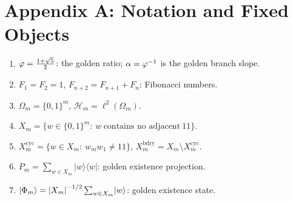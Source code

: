 \section{Appendix A: Notation and Fixed Objects}

\begin{enumerate}
  \item $\varphi=\frac{1+\sqrt5}{2}$: the golden ratio; $\alpha=\varphi^{-1}$ is the golden branch slope.
  \item $F_1=F_2=1$, $F_{n+2}=F_{n+1}+F_n$: Fibonacci numbers.
  \item $\Omega_m=\{0,1\}^m$, $\mathcal H_m=\ell^2(\Omega_m)$.
  \item $X_m=\{w\in\{0,1\}^m:\ w\ \text{contains no adjacent}\ 11\}$.
  \item $X_m^{\mathrm{cyc}}=\{w\in X_m:\ w_mw_1\neq 11\}$, $X_m^{\mathrm{bdry}}=X_m\setminus X_m^{\mathrm{cyc}}$.
  \item $P_m=\sum_{w\in X_m}\lvert w\rangle\langle w\rvert$: golden existence projection.
  \item $\lvert\Phi_m\rangle=\left\lvert X_m\right\rvert^{-1/2}\sum_{w\in X_m}\lvert w\rangle$: golden existence state.
\end{enumerate}

